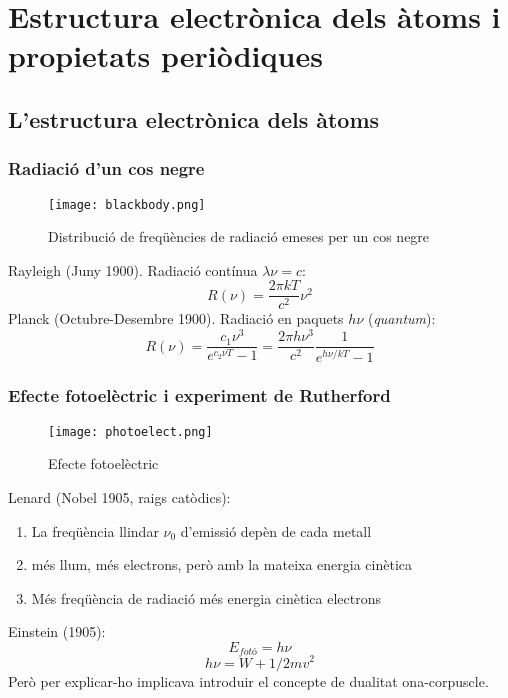 \chapter{Estructura electrònica dels àtoms i propietats periòdiques}

\section{L'estructura electrònica dels àtoms}
\subsection{Radiació d'un cos negre}
\begin{figure}[h]
\centering
\texttt{[image: blackbody.png]}
\caption{Distribució de freqüències de radiació emeses per un cos negre}
\label{fig:blackbody}
\end{figure}
Rayleigh (Juny 1900). Radiació contínua $\lambda \nu = c$:
\[
R(\nu)=\frac{2 \pi k T}{c^2} \nu^2
\]
Planck (Octubre-Desembre 1900). Radiació en paquets $h\nu$ (\textit{quantum}):
\[
R(\nu)=\frac{c_1 \nu^3}{e^{c_2 \nu T} -1}=\frac{2\pi h \nu^3}{c^2} \frac{1}{e^{h\nu/kT}-1}
\]
\subsection{Efecte fotoelèctric i experiment de Rutherford}
\begin{figure}[h]
\centering
\texttt{[image: photoelect.png]}
\caption{Efecte fotoelèctric}
\label{fig:photoelect}
\end{figure}
Lenard (Nobel 1905, raigs catòdics):
\begin{enumerate}
\item La freqüència llindar $\nu_0$ d'emissió depèn de cada metall
\item més llum, més electrons, però amb la mateixa energia cinètica
\item Més freqüència de radiació més energia cinètica electrons
\end{enumerate}
Einstein (1905):
\[
E_{fotó}=h \nu
\]
\[
h\nu = W + 1/2 m v^2
\]
Però per explicar-ho implicava introduir el concepte de dualitat ona-corpuscle.

